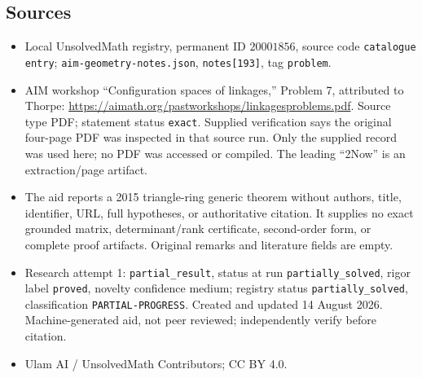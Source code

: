 \documentclass[11pt]{article}
\begin{document}
\subsection{Sources}
\begin{itemize}
\item Local UnsolvedMath registry, permanent ID \(20001856\), source code \texttt{catalogue entry}; \texttt{aim-geometry-notes.json}, \texttt{notes[193]}, tag \texttt{problem}.
\item AIM workshop ``Configuration spaces of linkages,'' Problem 7, attributed to Thorpe: \url{https://aimath.org/pastworkshops/linkagesproblems.pdf}. Source type PDF; statement status \texttt{exact}. Supplied verification says the original four-page PDF was inspected in that source run. Only the supplied record was used here; no PDF was accessed or compiled. The leading ``2Now'' is an extraction/page artifact.
\item The aid reports a 2015 triangle-ring generic theorem without authors, title, identifier, URL, full hypotheses, or authoritative citation. It supplies no exact grounded matrix, determinant/rank certificate, second-order form, or complete proof artifacts. Original remarks and literature fields are empty.
\item Research attempt 1: \texttt{partial\_result}, status at run \texttt{partially\_solved}, rigor label \texttt{proved}, novelty confidence medium; registry status \texttt{partially\_solved}, classification \texttt{PARTIAL-PROGRESS}. Created and updated 14 August 2026. Machine-generated aid, not peer reviewed; independently verify before citation.
\item Ulam AI / UnsolvedMath Contributors; CC BY 4.0.
\end{itemize}
\end{document}
